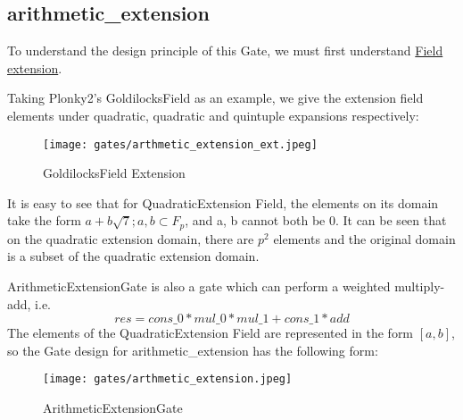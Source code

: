\subsection{arithmetic\_extension}

To understand the design principle of this Gate, we must first understand \href{https://en.wikipedia.org/wiki/Field_extension#Extension_field}{Field extension}. 


Taking Plonky2's GoldilocksField as an example, we give the extension field elements under quadratic, quadratic and quintuple expansions respectively:

\begin{figure}[!ht]
    \centering
    \texttt{[image: gates/arthmetic\_extension\_ext.jpeg]}
    \caption{GoldilocksField Extension}
    \label{fig:goldilocksfield-extension}
\end{figure}

It is easy to see that for QuadraticExtension Field, the elements on its domain take the form $a + b \sqrt{7}; a,b \subset F_p$, and a, b cannot both be 0.
It can be seen that on the quadratic extension domain, there are $p^2$ elements and the original domain is a subset of the quadratic extension domain.

ArithmeticExtensionGate is also a gate which can perform a weighted multiply-add, i.e.
\[res = cons\_0 * mul\_0 * mul\_1 + cons\_1 * add\]
The elements of the QuadraticExtension Field are represented in the form $[a, b]$, so the Gate design for arithmetic\_extension has the following form:

\begin{figure}[!ht]
    \centering
    \texttt{[image: gates/arthmetic\_extension.jpeg]}
    \caption{ArithmeticExtensionGate}
    \label{fig:arthmetic-extension}
\end{figure}